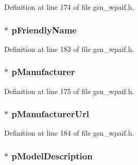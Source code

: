 Definition at line 174 of file gsn\_\-wpaif.h.

\hypertarget{a00427_a4e03d5ecd56303e62d97a9d17fecbef3}{
\subsubsection[{pFriendlyName}]{$\ast$ {\bf pFriendlyName}}}
\label{a00427_a4e03d5ecd56303e62d97a9d17fecbef3}


Definition at line 183 of file gsn\_\-wpaif.h.

\hypertarget{a00427_ac4d49e4679a63d847dcfbf72a54c43cf}{
\subsubsection[{pManufacturer}]{$\ast$ {\bf pManufacturer}}}
\label{a00427_ac4d49e4679a63d847dcfbf72a54c43cf}


Definition at line 175 of file gsn\_\-wpaif.h.

\hypertarget{a00427_ad8596c9cecbf3e023608c67be2595c94}{
\subsubsection[{pManufacturerUrl}]{$\ast$ {\bf pManufacturerUrl}}}
\label{a00427_ad8596c9cecbf3e023608c67be2595c94}


Definition at line 184 of file gsn\_\-wpaif.h.

\hypertarget{a00427_a1f151d37bd0ff988b2d3ffc6980be8d5}{
\subsubsection[{pModelDescription}]{$\ast$ {\bf pModelDescription}}}
\label{a00427_a1f151d37bd0ff988b2d3ffc6980be8d5}


